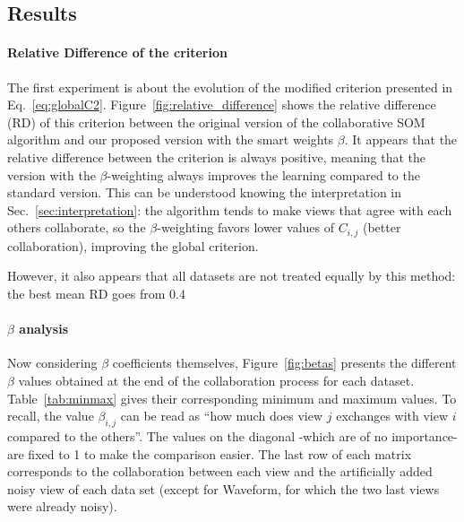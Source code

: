 \subsection{Results}


\paragraph{Relative Difference of the criterion}
The first experiment is about the evolution of the modified criterion presented in Eq.~\ref{eq:globalC2}. Figure~\ref{fig:relative_difference} shows the relative difference (RD) of this criterion between the original version of the collaborative SOM algorithm and our proposed version with the smart weights $\beta$. It appears that the relative difference between the criterion is always positive, meaning that the version with the $\beta$-weighting always improves the learning compared to the standard version. This can be understood knowing the interpretation in Sec.~\ref{sec:interpretation}: the algorithm tends to make views that agree with each others collaborate, so the $\beta$-weighting favors lower values of $C_{i,j}$ (better collaboration), improving the global criterion.

However, it also appears that all datasets are not treated equally by this method: the best mean RD goes from 0.4\

\paragraph{$\beta$ analysis}
Now considering $\beta$ coefficients themselves, Figure~\ref{fig:betas} presents the different $\beta$ values obtained at the end of the collaboration process for each dataset. Table~\ref{tab:minmax} gives their corresponding minimum and maximum values. To recall, the value $\beta_{i,j}$ can be read as ``how much does view $j$ exchanges with view $i$ compared to the others''. The values on the diagonal -which are of no importance- are fixed to 1 to make the comparison easier. The last row of each matrix corresponds to the collaboration between each view and the artificially added noisy view of each data set (except for Waveform, for which the two last views were already noisy). 


